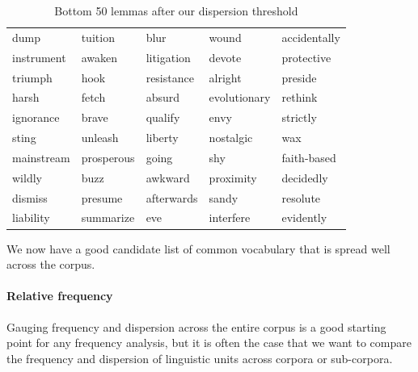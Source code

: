 \documentclass[
  letterpaper,
  krantz1]{latex/krantz-mod}
\let\oldparagraph\paragraph
\renewcommand{\paragraph}[1]{\oldparagraph{#1}\mbox{}}
\theoremstyle{definition}
\theoremstyle{definition}
\theoremstyle{remark}
\begin{document}
\begin{longtable}[]{@{}
  >{\raggedright\arraybackslash}p{}
  >{\raggedright\arraybackslash}p{}
  >{\raggedright\arraybackslash}p{}
  >{\raggedright\arraybackslash}p{}
  >{\raggedright\arraybackslash}p{}@{}}

\caption{\label{tbl-explore-masc-dp-filter-preview-bottom}Bottom 50
lemmas after our dispersion threshold}

\tabularnewline

\toprule\noalign{}
\endhead
\bottomrule\noalign{}
\endlastfoot
dump & tuition & blur & wound & accidentally \\
instrument & awaken & litigation & devote & protective \\
triumph & hook & resistance & alright & preside \\
harsh & fetch & absurd & evolutionary & rethink \\
ignorance & brave & qualify & envy & strictly \\
sting & unleash & liberty & nostalgic & wax \\
mainstream & prosperous & going & shy & faith-based \\
wildly & buzz & awkward & proximity & decidedly \\
dismiss & presume & afterwards & sandy & resolute \\
liability & summarize & eve & interfere & evidently \\

\end{longtable}

We now have a good candidate list of common vocabulary that is spread
well across the corpus.

\paragraph{Relative frequency}\label{sec-explore-frequency-relative}

\vspace{-1em}

Gauging frequency and dispersion across the entire corpus is a good
starting point for any frequency analysis, but it is often the case that
we want to compare the frequency and dispersion of linguistic units
across corpora or sub-corpora.
\end{document}
